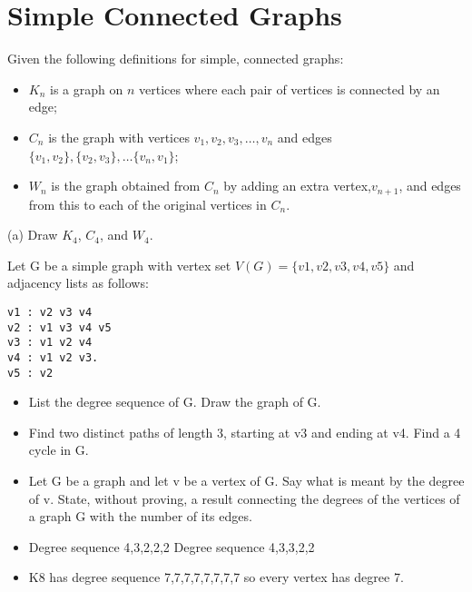 \documentclass[12pt]{article}
\begin{document}
\section{Simple Connected Graphs}
Given the following definitions for simple, connected graphs:
\begin{itemize}
\item $K_n$ is a graph on $n$ vertices where each pair of vertices is connected by an edge;
\item $C_n$ is the graph with vertices $v_1, v_2, v_3, \dots, v_n$ and edges $\{v_1,v_2\}, \{v_2,v_3\}, \dots\{v_n, v_1\}$;
\item $W_n$ is the graph obtained from $C_n$ by adding an extra vertex,$v_{n+1}$, and edges
from this to each of the original vertices in $C_n$.
\end{itemize}
(a) Draw $K_4$, $C_4$, and $W_4$. 



Let G be a simple graph with vertex set $V(G) = \{v1, v2, v3, v4, v5\}$ and adjacency lists as follows:
\begin{verbatim}
v1 : v2 v3 v4
v2 : v1 v3 v4 v5
v3 : v1 v2 v4
v4 : v1 v2 v3.
v5 : v2
\end{verbatim}
\begin{itemize}
\item[5.a] List the degree sequence of G. Draw the graph of G.
\item[5.b] Find two distinct paths of length 3, starting at v3 and ending at v4. Find a 4 cycle in G.
\item[5.c] Let G be a graph and let v be a vertex of G. Say what is meant by the degree of v.
State, without proving, a result connecting the degrees of the vertices of a graph G with the number of its edges.

\item[5.d]
Degree sequence 4,3,2,2,2
Degree sequence 4,3,3,2,2

\item[5.e]
K8 has degree sequence 7,7,7,7,7,7,7,7 so every vertex has degree 7.
\end{itemize}
\end{document}
